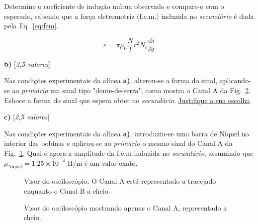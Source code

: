 \documentclass[11pt,a4paper,final]{article}
\begin{document}
Determine o coeficiente de indu\c{c}\~{a}o m\'{u}tua observado e compare-o com o esperado, sabendo que a for\c{c}a eletromotriz (f.e.m.) induzida no \emph{secund\'{a}rio} é dada pela Eq.~\ref{eq:fem}.

\begin{equation}
\label{eq:fem}
\varepsilon=\pi\mu_0\frac{N}{l}r^2N_b\frac{\mathrm d i}{\mathrm d t}
\end{equation}

\textbf{b)} \hfill [\textit{2,5 valores}]

Nas condi\c{c}\~{o}es experimentais da al\'{i}nea \textbf{a)}, alterou-se a forma do sinal, aplicando-se ao \emph{prim\'{a}rio} um sinal tipo "dente-de-serra", como mostra o Canal A da Fig.~\ref{fig:osci2}. Esboce a forma do sinal que espera obter no \emph{secund\'{a}rio}. \underline{Justifique a sua escolha}.

\textbf{c)} \hfill [\textit{2,5 valores}]

Nas condi\c{c}\~{o}es experimentais da al\'{i}nea \textbf{a)}, introduziu-se uma barra de N\'{i}quel no interior das bobinas e aplicou-se ao \emph{prim\'{a}rio} o mesmo sinal do Canal A da Fig.~\ref{fig:osci1}. Qual \'{e} agora a amplitude da f.e.m induzida no \emph{secund\'{a}rio}, assumindo que $\mu_\text{N\'{i}quel}=1.25\times10^{-4}$ H/m é um valor exato.

\newpage

\begin{figure}
\begin{center}
\caption{\label{fig:osci1}Visor do oscilosc\'{o}pio. O Canal A est\'{a} representado a tracejado enquanto o Canal B a cheio.}
\end{center}
\end{figure}

\begin{figure}
\begin{center}
\caption{\label{fig:osci2}Visor do oscilosc\'{o}pio mostrando apenas o Canal A, representado a cheio.}
\end{center}
\end{figure}
\end{document}
